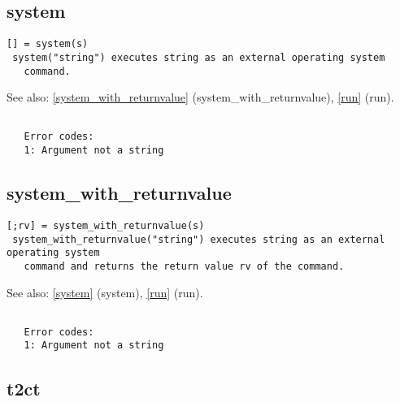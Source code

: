 \documentclass[a4paper]{article}
\begin{document}
\subsection{system\label{system}}

\begin{tscreen}
\begin{verbatim}
[] = system(s)
 system("string") executes string as an external operating system
   command.
\end{verbatim}

See also: \ref{system_with_returnvalue} {(system\_with\_returnvalue)}, \ref{run} {(run)}.
\begin{verbatim}

   Error codes:
   1: Argument not a string 
\end{verbatim}
\end{tscreen}





\subsection{system\_with\_returnvalue\label{system_with_returnvalue}}

\begin{tscreen}
\begin{verbatim}
[;rv] = system_with_returnvalue(s)
 system_with_returnvalue("string") executes string as an external operating system
   command and returns the return value rv of the command.
\end{verbatim}

See also: \ref{system} {(system)}, \ref{run} {(run)}.
\begin{verbatim}

   Error codes:
   1: Argument not a string 
\end{verbatim}
\end{tscreen}





\subsection{t2ct\label{t2ct}}
\end{document}
